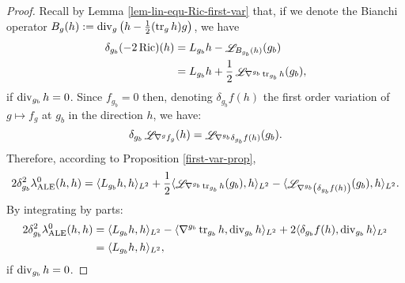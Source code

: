 \documentclass[a4paper,11pt,reqno]{amsart}
\def\Ric{\mathop{\rm Ric}\nolimits}
\def\tr{\mathop{\rm tr}\nolimits}
\def\div{\mathop{\rm div}\nolimits}
\def\Li{\mathop{\rm \mathscr{L}}\nolimits}
\def\Ric{\mathop{\rm Ric}\nolimits}
\def\tr{\mathop{\rm tr}\nolimits}
\def\div{\mathop{\rm div}\nolimits}
\def\Li{\mathop{\rm \mathscr{L}}\nolimits}
\numberwithin{equation}{section}
\begin{document}
	\begin{proof}
		
		Recall by Lemma \ref{lem-lin-equ-Ric-first-var} that, if we denote the Bianchi operator $B_g(h):= \div_g\big(h-\frac{1}{2}(\tr_g h)g\big)$, we have
		\begin{equation*}
		\begin{split}
		\delta_{g_b}(-2\Ric)(h)&=L_{g_b}h-\Li_{B_{g_b}(h)}(g_b)\\
		&=L_{g_b}h+\frac{1}{2}\Li_{\nabla^{g_b}\tr_{g_b}h}(g_b),
		\end{split}
		\end{equation*}
		if $\div_{g_b}h=0$. Since $f_{g_b}=0$ then, denoting $\delta_{g_b}f(h)$ the first order variation of $g\mapsto f_g$ at $g_b$ in the direction $h$, we have:
		\begin{equation*}
		\delta_{g_b}\Li_{\nabla^gf_g}(h)=\Li_{\nabla^{g_b}\delta_{g_b}f(h)}(g_b).
		\end{equation*}
		Therefore, according to Proposition \ref{first-var-prop},
		\begin{equation*}
		2\delta_{g_b}^2\lambda_{\operatorname{ALE}}^0(h,h)=\langle L_{g_b}h,h\rangle_{L^2}+ \frac{1}{2}\langle\Li_{\nabla^{g_b}\tr_{g_b}h}(g_b),h\rangle_{L^2}-\langle \Li_{\nabla^{g_b}\left(\delta_{g_b}f(h)\right)}(g_b),h\rangle_{L^2}.
		\end{equation*}
		By integrating by parts:
		\begin{equation*}
		\begin{split}
		2\delta_{g_b}^2\lambda_{\operatorname{ALE}}^0(h,h)&=\langle L_{g_b}h,h\rangle_{L^2}-\langle\nabla^{g_b}\tr_{g_b}h,\div_{g_b}h\rangle_{L^2}+2\langle \delta_{g_b}f(h),\div_{g_b}h\rangle_{L^2}\\
		&=\langle L_{g_b}h,h\rangle_{L^2},
		\end{split}
		\end{equation*}
		if $\div_{g_b}h=0$.
	\end{proof}
\end{document}
